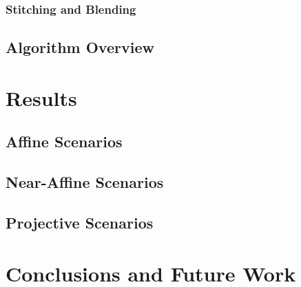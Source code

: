 \documentclass[11pt]{report}
\begin{document}
\begin{doublespace}
\subsection{Stitching and Blending}

\indent



\section{Algorithm Overview}

\indent




\chapter{Results}

\indent


\section{Affine Scenarios}

\indent



\section{Near-Affine Scenarios}

\indent



\section{Projective Scenarios}

\indent





\chapter{Conclusions and Future Work}


\end{doublespace}
\end{document}
